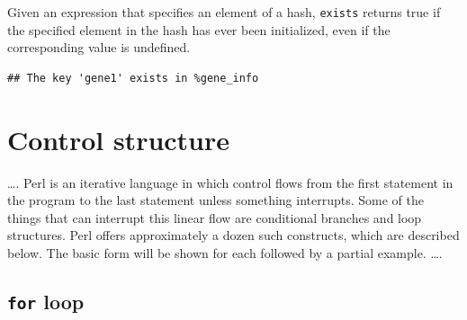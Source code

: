 \documentclass[]{book}
\makeatletter
\newenvironment{Shaded}{\begin{snugshade}}{\end{snugshade}}
\newcommand{\CharTok}[1]{\textcolor[rgb]{0.31,0.60,0.02}{#1}}
\newcommand{\DataTypeTok}[1]{\textcolor[rgb]{0.13,0.29,0.53}{#1}}
\newcommand{\FunctionTok}[1]{\textcolor[rgb]{0.00,0.00,0.00}{#1}}
\newcommand{\KeywordTok}[1]{\textcolor[rgb]{0.13,0.29,0.53}{\textbf{#1}}}
\newcommand{\NormalTok}[1]{#1}
\newcommand{\StringTok}[1]{\textcolor[rgb]{0.31,0.60,0.02}{#1}}
\newenvironment{kframe}{%
\medskip{}
\setlength{\fboxsep}{.8em}
 \def\at@end@of@kframe{}%
 \ifinner\ifhmode%
  \def\at@end@of@kframe{\end{minipage}}%
  \begin{minipage}{\columnwidth}%
 \fi\fi%
 \def\FrameCommand##1{\hskip\@totalleftmargin \hskip-\fboxsep
 \colorbox{shadecolor}{##1}\hskip-\fboxsep
     \hskip-\linewidth \hskip-\@totalleftmargin \hskip\columnwidth}%
 \MakeFramed {\advance\hsize-\width
   \@totalleftmargin\z@ \linewidth\hsize
   \@setminipage}}%
 {\par\unskip\endMakeFramed%
 \at@end@of@kframe}
\renewenvironment{Shaded}{\begin{kframe}}{\end{kframe}}
\makeatother
\begin{document}
Given an expression that specifies an element of a hash, \texttt{exists} returns true if the specified element in the hash has ever been initialized, even if the corresponding value is undefined.

\begin{Shaded}
\end{Shaded}

\begin{verbatim}
## The key 'gene1' exists in %gene_info
\end{verbatim}

\hypertarget{control-structure}{%
\chapter{Control structure}\label{control-structure}}

\ldots{}.
Perl is an iterative language in which control flows from the first statement in the program to the last statement unless something interrupts. Some of the things that can interrupt this linear flow are conditional branches and loop structures. Perl offers approximately a dozen such constructs, which are described below. The basic form will be shown for each followed by a partial example.
\ldots{}.

\hypertarget{for-loop}{%
\section{\texorpdfstring{\texttt{for} loop}{for loop}}\label{for-loop}}
\end{document}
